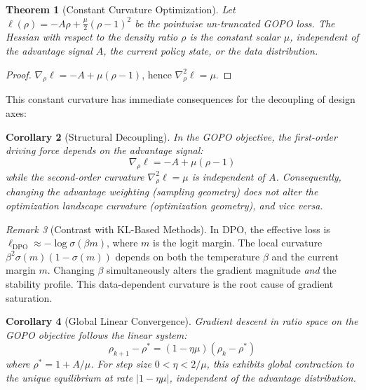 \documentclass[11pt]{article}
\newtheorem{theorem}{Theorem}[section]
\newtheorem{corollary}[theorem]{Corollary}
\theoremstyle{definition}
\theoremstyle{remark}
\newtheorem{remark}[theorem]{Remark}
\begin{document}
\begin{theorem}[Constant Curvature Optimization]
\label{thm:constant_curvature}
Let $\ell(\rho) = -A\rho + \frac{\mu}{2}(\rho - 1)^2$ be the pointwise un-truncated GOPO loss. The Hessian with respect to the density ratio $\rho$ is the constant scalar $\mu$, independent of the advantage signal $A$, the current policy state, or the data distribution.
\end{theorem}

\begin{proof}
$\nabla_\rho \ell = -A + \mu(\rho - 1)$, hence $\nabla^2_\rho \ell = \mu$.
\end{proof}

This constant curvature has immediate consequences for the decoupling of design axes:

\begin{corollary}[Structural Decoupling]
\label{cor:decoupling}
In the GOPO objective, the first-order driving force depends on the advantage signal:
\begin{equation}
    \nabla_\rho \ell = -A + \mu(\rho - 1)
\end{equation}
while the second-order curvature $\nabla^2_\rho \ell = \mu$ is independent of $A$. Consequently, changing the advantage weighting (sampling geometry) does not alter the optimization landscape curvature (optimization geometry), and vice versa.
\end{corollary}

\begin{remark}[Contrast with KL-Based Methods]
In DPO, the effective loss is $\ell_{\text{DPO}} \approx -\log\sigma(\beta m)$, where $m$ is the logit margin. The local curvature $\beta^2\sigma(m)(1-\sigma(m))$ depends on both the temperature $\beta$ and the current margin $m$. Changing $\beta$ simultaneously alters the gradient magnitude \emph{and} the stability profile. This data-dependent curvature is the root cause of gradient saturation.
\end{remark}

\begin{corollary}[Global Linear Convergence]
\label{cor:convergence}
Gradient descent in ratio space on the GOPO objective follows the linear system:
\begin{equation}
    \rho_{k+1} - \rho^* = (1 - \eta\mu)(\rho_k - \rho^*)
\end{equation}
where $\rho^* = 1 + A/\mu$. For step size $0 < \eta < 2/\mu$, this exhibits global contraction to the unique equilibrium at rate $|1 - \eta\mu|$, independent of the advantage distribution.
\end{corollary}
\end{document}
